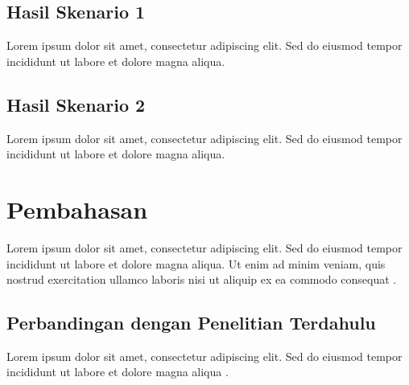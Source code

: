 \subsection{Hasil Skenario 1}


Lorem ipsum dolor sit amet, consectetur adipiscing elit. Sed do eiusmod tempor incididunt ut labore et dolore magna aliqua.

\subsection{Hasil Skenario 2}


Lorem ipsum dolor sit amet, consectetur adipiscing elit. Sed do eiusmod tempor incididunt ut labore et dolore magna aliqua.

\section{Pembahasan}


Lorem ipsum dolor sit amet, consectetur adipiscing elit. Sed do eiusmod tempor incididunt ut labore et dolore magna aliqua. Ut enim ad minim veniam, quis nostrud exercitation ullamco laboris nisi ut aliquip ex ea commodo consequat \citep{referensi2}.

\subsection{Perbandingan dengan Penelitian Terdahulu}


Lorem ipsum dolor sit amet, consectetur adipiscing elit. Sed do eiusmod tempor incididunt ut labore et dolore magna aliqua \citep{referensi3}.
